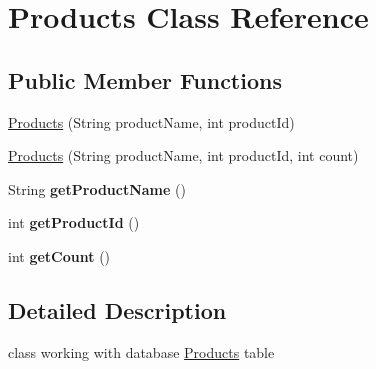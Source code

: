 \hypertarget{classProducts}{\section{Products Class Reference}
\label{classProducts}
}
\subsection*{Public Member Functions}
\begin{DoxyCompactItemize}
\item 
\hyperlink{classProducts_a0d3b003cc39f708ccb96d9e6c6842630}{Products} (String product\-Name, int product\-Id)
\item 
\hyperlink{classProducts_a34c510e0a59c20334dc3d52e61660a63}{Products} (String product\-Name, int product\-Id, int count)
\item 
\hypertarget{classProducts_aba3076eb4facae420e00dae97b801cb1}{String {\bfseries get\-Product\-Name} ()}\label{classProducts_aba3076eb4facae420e00dae97b801cb1}

\item 
\hypertarget{classProducts_a5eea059c083bc852bfcb1582e508ee47}{int {\bfseries get\-Product\-Id} ()}\label{classProducts_a5eea059c083bc852bfcb1582e508ee47}

\item 
\hypertarget{classProducts_aa0fe97587fa1a7db8ca04ffec12aa2ac}{int {\bfseries get\-Count} ()}\label{classProducts_aa0fe97587fa1a7db8ca04ffec12aa2ac}

\end{DoxyCompactItemize}


\subsection{Detailed Description}
class working with database \hyperlink{classProducts}{Products} table 

